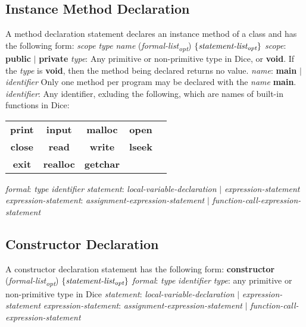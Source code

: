 \begin{homeworkProblem}
    \subsection{Instance Method Declaration}
    A method declaration statement declares an instance method of a class and has the following form:
    \newline
    \textit{scope} \textit{type} \textit{name} (\textit{formal-list\textsubscript{opt}}) $\left\{ \textit{statement-list\textsubscript{opt}} \right\}$
    \newline
    \textit{scope}: \textbf{public} $|$ \textbf{private}
    \newline
    \textit{type}: Any primitive or non-primitive type in Dice, or \textbf{void}. If the \textit{type} is \textbf{void}, then the method being declared returns no value.
    \newline
    \textit{name}: \textbf{main} $|$ \textit{identifier}
    \newline
    Only one method per program may be declared with the \textit{name} \textbf{main}.
    \newline
    \textit{identifier}: Any identifier, exluding the following, which are names of built-in functions in Dice:
    \newline
    \begin{center}
    \begin{tabular}{ccccc}
    \textbf{print} & \textbf{input} & \textbf{malloc} & \textbf{open} \\
    \textbf{close} & \textbf{read} & \textbf{write} & \textbf{lseek} \\
    \textbf{exit} & \textbf{realloc} & \textbf{getchar}
    \end{tabular}
    \end{center}
    \textit{formal}: \textit{type} \textit{identifier}
    \newline
    \textit{statement}: \textit{local-variable-declaration} $|$ \textit{expression-statement}
    \newline
    \textit{expression-statement}: \textit{assignment-expression-statement} $|$ \textit{function-call-expression-statement}

    \subsection{Constructor Declaration}
    A constructor declaration statement has the following form:
    \newline
    \textbf{constructor} (\textit{formal-list\textsubscript{opt}}) $\left\{ \textit{statement-list\textsubscript{opt}} \right\}$
    \newline
    \textit{formal}: \textit{type} \textit{identifier}
    \newline
    \textit{type}: any primitive or non-primitive type in Dice
    \newline
    \textit{statement}: \textit{local-variable-declaration} $|$ \textit{expression-statement}
    \newline
    \textit{expression-statement}: \textit{assignment-expression-statement} $|$ \textit{function-call-expression-statement}


\end{homeworkProblem}
